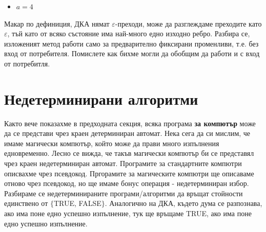 \begin{examplecp}
\begin{itemize}
\begin{figure}[H]
{}
		\end{figure}
		
		\item $a=4$
		\begin{figure}[H]
			\centering
		\end{figure}
	\end{itemize}
	\noindent
	Макар по дефиниция, ДКА нямат $\varepsilon$-преходи, може да разглеждаме преходите като $\varepsilon$, тъй като от всяко състояние има най-много едно изходно ребро. Разбира се, изложеният метод работи само за предварително фиксирани променливи, т.е. без вход от потребителя. Помислете как бихме могли да обобщим да работи и с вход от потребитля.
\end{examplecp}%

\section{Недетерминирани алгоритми}

Както вече показахме в предходната секция, всяка програма \textbf{за компютър} може да се представи чрез краен детерминиран автомат. Нека сега да си мислим, че имаме магически компютър, който може да прави много изпълнения едновременно. Лесно се вижда, че такъв магически компютър би се представял чрез краен недетерминиран автомат. Програмите за стандартните компютри описвахме чрез псевдокод. Пргорамите за магическите компютри ще описаваме отново чрез псевдокод, но ще имаме бонус операция - недетерминиран избор. Разбираме се недетерминираните програми/алгоритми да връщат стойности единствено от $\{$TRUE, FALSE$\}$. Аналогично на ДКА, където дума се разпознава, ако има поне едно успешно изпълнение, тук ще връщаме TRUE, ако има поне едно успешно изпълнение.


